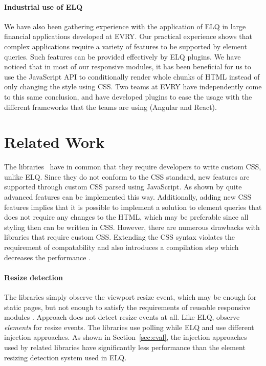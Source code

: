 \documentclass[sigconf,9pt]{acmart}
\newcommand{\elq}{ELQ}
\begin{document}
    \paragraph{Industrial use of \elq{}}
    We have also been gathering experience with the application of
    \elq{} in large financial applications developed at EVRY.
    Our practical experience shows that complex applications
    require a variety of features to be supported by element queries.
    Such features can be provided effectively by \elq{} plugins.
    We have noticed that in most of our responsive modules, it has been beneficial for us to use the JavaScript API
    to conditionally render whole chunks of HTML instead of only changing the style using CSS.
    Two teams at EVRY have independently come to this same conclusion, and have developed plugins to ease the usage with the different frameworks that the teams are using (Angular and React).

\section{Related Work}\label{sec:related}
  The libraries~\cite{eq_imp_magichtml,eq_imp_eqcss,eq_imp_prollyfill-min-width,eq_imp_localised-css,eq_imp_gss} have in common that they require developers to write custom CSS, unlike \elq{}.
  Since they do not conform to the CSS standard, new features are supported through custom CSS parsed using JavaScript.
  As shown by \cite{eq_imp_eqcss,eq_imp_gss} quite advanced features can be implemented this way.
  Additionally, adding new CSS features implies that it is possible to implement a solution to element queries that does not require any changes to the HTML, which may be preferable since all styling then can be written in CSS.
  However, there are numerous drawbacks with libraries that require custom CSS.
  Extending the CSS syntax violates the requirement of compatability and also introduces a compilation step which decreases the performance \cite{elq-thesis}.

  \paragraph{Resize detection}
  The libraries \cite{eq_imp_eqcss,eq_imp_breakpointsjs,eq_imp_mediaclass,eq_imp_elementquery,eq_imp_responsive-elements,eq_imp_sickles,eq_imp_responsive-elements-2,eq_imp_breaks2000,eq_imp_eqjs} simply observe the viewport resize event, which may be enough for static pages, but not enough to satisfy the requirements of reusable responsive modules \cite{elq-thesis}.
  Approach \cite{eq_imp_classquery} does not detect resize events at all.
  Like \elq{}, \cite{eq_imp_localised-css,eq_imp_selector_queries,eq_imp_prollyfill-min-width,eq_imp_gss,eq_imp_element-queries,eq_imp_css-element-queries} observe \emph{elements} for resize events.
  The libraries \cite{eq_imp_localised-css,eq_imp_selector_queries} use polling while \elq{} and \cite{eq_imp_prollyfill-min-width,eq_imp_gss,eq_imp_element-queries,eq_imp_css-element-queries} use different injection approaches.
  As shown in Section~\ref{sec:eval}, the injection approaches used by related libraries have significantly less performance than the element resizing detection system used in \elq{}.
\end{document}

